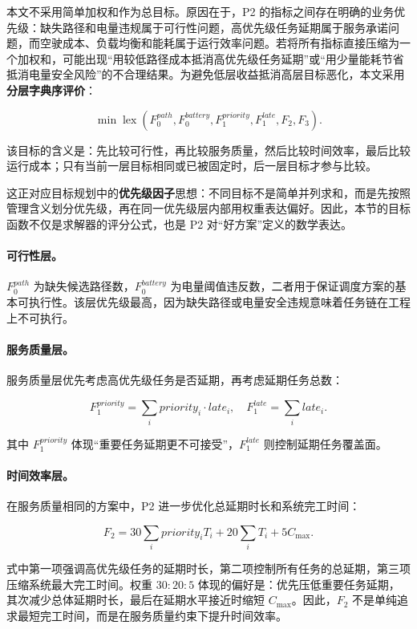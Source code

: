 本文不采用简单加权和作为总目标。原因在于，P2 的指标之间存在明确的业务优先级：缺失路径和电量违规属于可行性问题，高优先级任务延期属于服务承诺问题，而空驶成本、负载均衡和能耗属于运行效率问题。若将所有指标直接压缩为一个加权和，可能出现“用较低路径成本抵消高优先级任务延期”或“用少量能耗节省抵消电量安全风险”的不合理结果。为避免低层收益抵消高层目标恶化，本文采用\textbf{分层字典序评价}：

\[
\min \operatorname{lex}
\left(
F_0^{path},F_0^{battery},
F_1^{priority},F_1^{late},
F_2,F_3
\right).
\]

该目标的含义是：先比较可行性，再比较服务质量，然后比较时间效率，最后比较运行成本；只有当前一层目标相同或已被固定时，后一层目标才参与比较。

这正对应目标规划中的\textbf{优先级因子}思想：不同目标不是简单并列求和，而是先按照管理含义划分优先级，再在同一优先级层内部用权重表达偏好。因此，本节的目标函数不仅是求解器的评分公式，也是 P2 对“好方案”定义的数学表达。

\paragraph{可行性层。}
$F_0^{path}$ 为缺失候选路径数，$F_0^{battery}$ 为电量阈值违反数，二者用于保证调度方案的基本可执行性。该层优先级最高，因为缺失路径或电量安全违规意味着任务链在工程上不可执行。

\paragraph{服务质量层。}
服务质量层优先考虑高优先级任务是否延期，再考虑延期任务总数：

\[
F_1^{priority}=\sum_i priority_i\cdot late_i,\quad
F_1^{late}=\sum_i late_i.
\]

其中 $F_1^{priority}$ 体现“重要任务延期更不可接受”，$F_1^{late}$ 则控制延期任务覆盖面。

\paragraph{时间效率层。}
在服务质量相同的方案中，P2 进一步优化总延期时长和系统完工时间：

\[
F_2=30\sum_i priority_i T_i+20\sum_i T_i+5C_{\max}.
\]

式中第一项强调高优先级任务的延期时长，第二项控制所有任务的总延期，第三项压缩系统最大完工时间。权重 $30:20:5$ 体现的偏好是：优先压低重要任务延期，其次减少总体延期时长，最后在延期水平接近时缩短 $C_{\max}$。因此，$F_2$ 不是单纯追求最短完工时间，而是在服务质量约束下提升时间效率。

